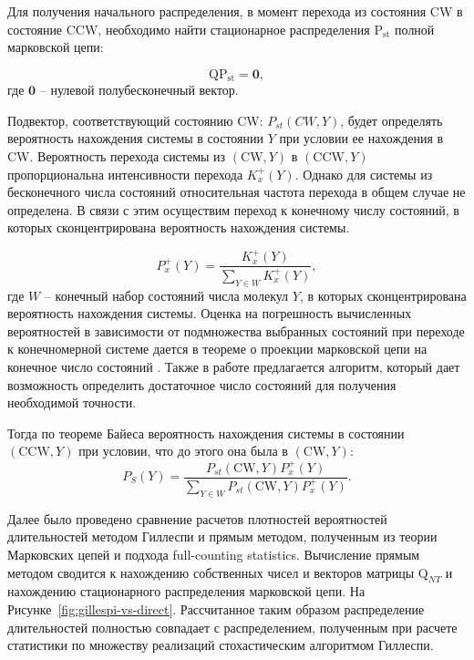 Для получения начального распределения, в момент перехода из состояния CW в состояние CCW, необходимо найти стационарное распределения $\boldsymbol{\mathrm{P_{st}}}$ полной марковской цепи:

\begin{equation}
    \boldsymbol{\mathrm{Q}} \boldsymbol{\mathrm{P_{st}}} = \boldsymbol{0},
    \label{eq:transitions-stationary}
\end{equation}
где $\boldsymbol{0}$ -- нулевой полубесконечный вектор.

Подвектор, соответствующий состоянию CW: ${P_{st}(CW, Y)}$, будет определять вероятность нахождения системы в состоянии $Y$ при условии ее нахождения в CW. Вероятность перехода системы из $(\mathrm{CW}, Y)$ в $(\mathrm{CCW}, Y)$ пропорциональна интенсивности перехода $K_x^+(Y)$. Однако для системы из бесконечного числа состояний относительная частота перехода в общем случае не определена. В связи с этим осуществим переход к конечному числу состояний, в которых сконцентрирована вероятность нахождения системы. 

\begin{equation}
    P_x^+(Y)=\frac{K_x^+(Y)}{\sum_{Y\in W} K_x^+(Y)},
    \label{eq:cw-to-ccw-prob}
\end{equation}
где $W$ -- конечный набор состояний числа молекул $Y$, в которых сконцентрирована вероятность нахождения системы. Оценка на погрешность вычисленных вероятностей в зависимости от подмножества выбранных состояний при переходе к конечномерной системе дается в теореме о проекции марковской цепи на конечное число состояний \cite{munsky_finite_2006}. Также в работе предлагается алгоритм, который дает возможность определить достаточное число состояний для получения необходимой точности.

Тогда по теореме Байеса вероятность нахождения системы в состоянии $(\mathrm{CCW}, Y)$ при условии, что до этого она была в $(\mathrm{CW}, Y)$:
\begin{equation}
    P_S(Y)=\frac{P_{st}(\mathrm{CW}, Y) P_x^+(Y)}{\sum_{Y\in W} P_{st}(\mathrm{CW}, Y) P_x^+(Y)}.
    \label{eq:start-prob-solution}
\end{equation}

Далее было проведено сравнение расчетов плотностей вероятностей длительностей методом Гиллеспи и прямым методом, полученным из теории Марковских цепей и подхода full-counting statistics. Вычисление прямым методом сводится к нахождению собственных чисел и векторов матрицы $\boldsymbol{\mathrm{Q}}_{NT}$ и нахождению стационарного распределения марковской цепи. На Рисунке~\cref{fig:gillespi-vs-direct}. Рассчитанное таким образом распределение длительностей полностью совпадает с распределением, полученным при расчете статистики по множеству реализаций стохастическим алгоритмом Гиллеспи.

